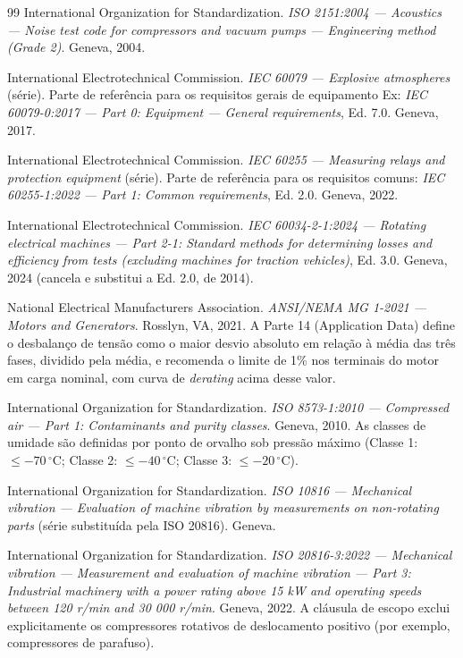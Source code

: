 \documentclass[12pt,a4paper]{article}
\numberwithin{equation}{section}
\numberwithin{table}{section}
\numberwithin{figure}{section}
\begin{document}
\begin{thebibliography}{99}
 International Organization for Standardization. \textit{ISO 2151:2004 — Acoustics — Noise test code for compressors and vacuum pumps — Engineering method (Grade 2)}. Geneva, 2004.

 International Electrotechnical Commission. \textit{IEC 60079 — Explosive atmospheres} (série). Parte de referência para os requisitos gerais de equipamento Ex: \textit{IEC 60079-0:2017 — Part 0: Equipment — General requirements}, Ed. 7.0. Geneva, 2017.

 International Electrotechnical Commission. \textit{IEC 60255 — Measuring relays and protection equipment} (série). Parte de referência para os requisitos comuns: \textit{IEC 60255-1:2022 — Part 1: Common requirements}, Ed. 2.0. Geneva, 2022.

 International Electrotechnical Commission. \textit{IEC 60034-2-1:2024 — Rotating electrical machines — Part 2-1: Standard methods for determining losses and efficiency from tests (excluding machines for traction vehicles)}, Ed. 3.0. Geneva, 2024 (cancela e substitui a Ed. 2.0, de 2014).

 National Electrical Manufacturers Association. \textit{ANSI/NEMA MG 1-2021 — Motors and Generators}. Rosslyn, VA, 2021. A Parte 14 (Application Data) define o desbalanço de tensão como o maior desvio absoluto em relação à média das três fases, dividido pela média, e recomenda o limite de 1\% nos terminais do motor em carga nominal, com curva de \textit{derating} acima desse valor.

 International Organization for Standardization. \textit{ISO 8573-1:2010 — Compressed air — Part 1: Contaminants and purity classes}. Geneva, 2010. As classes de umidade são definidas por ponto de orvalho sob pressão máximo (Classe 1: $\le -70\,^{\circ}$C; Classe 2: $\le -40\,^{\circ}$C; Classe 3: $\le -20\,^{\circ}$C).

 International Organization for Standardization. \textit{ISO 10816 — Mechanical vibration — Evaluation of machine vibration by measurements on non-rotating parts} (série substituída pela ISO 20816). Geneva.

 International Organization for Standardization. \textit{ISO 20816-3:2022 — Mechanical vibration — Measurement and evaluation of machine vibration — Part 3: Industrial machinery with a power rating above 15 kW and operating speeds between 120 r/min and 30 000 r/min}. Geneva, 2022. A cláusula de escopo exclui explicitamente os compressores rotativos de deslocamento positivo (por exemplo, compressores de parafuso).


\end{thebibliography}
\end{document}
